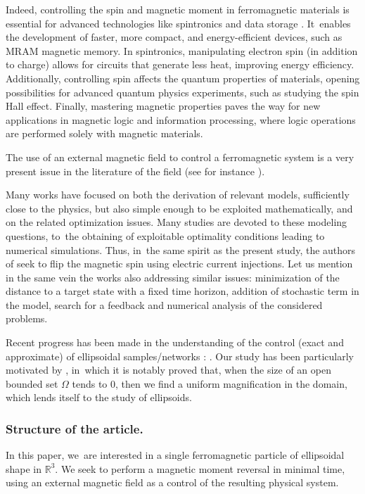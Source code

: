\documentclass[10pt]{amsart}
\theoremstyle{definition}
\newcommand{\R} {\mathbb{R}}
\begin{document}
{Indeed, controlling the spin and magnetic moment in ferromagnetic materials is essential for advanced technologies like spintronics and data storage \cite{chappert2007emergence,apalkov2013spin}. It~enables the development of faster, more compact, and energy-efficient devices, such as MRAM magnetic memory. In spintronics, manipulating electron spin (in addition to charge) allows for circuits that generate less heat, improving energy efficiency. Additionally, controlling spin affects the quantum properties of materials, opening possibilities for advanced quantum physics experiments, such as studying the spin Hall effect. Finally, mastering magnetic properties paves the way for new applications in magnetic logic and information processing, where logic operations are performed solely with magnetic materials.}

The use of an external magnetic field to control a ferromagnetic system is a very present issue in the literature of the field (see for instance \cite{MR2375581,MR3348399,MR1773088,MR3011326}).

Many works have focused on both the derivation of relevant models, \ie sufficiently close to the physics, but also simple enough to be exploited mathematically, and on the related optimization issues. Many studies are devoted to these modeling questions, to~the obtaining of exploitable optimality conditions leading to numerical simulations. Thus, in~the same spirit as the present study, the authors of \cite{MR4419351} seek to flip the magnetic spin using electric current injections. Let us mention in the same vein the works \cite{MR3407264,MR3961301} also addressing similar issues: minimization of the distance to a target state with a fixed time horizon, addition of stochastic term in the model, search for a feedback and numerical analysis of the considered problems.

Recent progress has been made in the understanding of the control (exact and approximate) of ellipsoidal samples/networks : \cite{dubey2019controllability,5399599,MR2833256}. Our study has been particularly motivated by \cite{alouges2009magnetization}, in~which it is notably proved that, when the size of an open bounded set $\Omega$ tends to 0, then we find a uniform magnification in the domain, which lends itself to the study of ellipsoids.

\subsubsection*{Structure of the article. }In this paper, we~are interested in a single ferromagnetic particle of ellipsoidal shape in $\R^3$. We seek to perform a magnetic moment reversal in minimal time, using an external magnetic field as a control of the resulting physical system.
\end{document}

